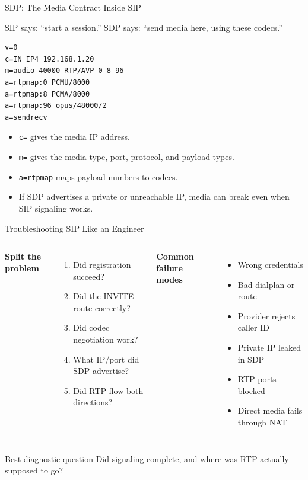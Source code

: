 \documentclass[aspectratio=169]{beamer}
\begin{document}
\begin{frame}[fragile]{SDP: The Media Contract Inside SIP}
  \begin{block}{SIP says: ``start a session.'' SDP says: ``send media here, using these codecs.''}
  \end{block}

  \small
\begin{verbatim}
v=0
c=IN IP4 192.168.1.20
m=audio 40000 RTP/AVP 0 8 96
a=rtpmap:0 PCMU/8000
a=rtpmap:8 PCMA/8000
a=rtpmap:96 opus/48000/2
a=sendrecv
\end{verbatim}

  \vspace{0.2cm}
  \begin{itemize}
    \item \texttt{c=} gives the media IP address.
    \item \texttt{m=} gives the media type, port, protocol, and payload types.
    \item \texttt{a=rtpmap} maps payload numbers to codecs.
    \item If SDP advertises a private or unreachable IP, media can break even when SIP signaling works.
  \end{itemize}
\end{frame}

\begin{frame}{Troubleshooting SIP Like an Engineer}
  \begin{columns}[T]
      \textbf{Split the problem}
      \begin{enumerate}
        \item Did registration succeed?
        \item Did the INVITE route correctly?
        \item Did codec negotiation work?
        \item What IP/port did SDP advertise?
        \item Did RTP flow both directions?
      \end{enumerate}

      \textbf{Common failure modes}
      \begin{itemize}
        \item Wrong credentials
        \item Bad dialplan or route
        \item Provider rejects caller ID
        \item Private IP leaked in SDP
        \item RTP ports blocked
        \item Direct media fails through NAT
      \end{itemize}
  \end{columns}

  \vspace{0.35cm}
  \begin{block}{Best diagnostic question}
    Did signaling complete, and where was RTP actually supposed to go?
  \end{block}
\end{frame}
\end{document}
